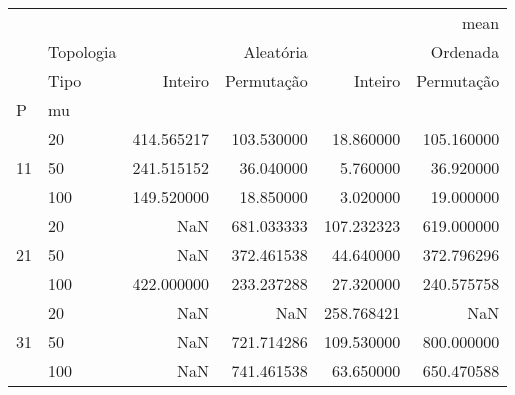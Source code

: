 \begin{tabular}{llrrrr}
\toprule
 &  & \multicolumn{4}{r}{mean} \\
 & Topologia & \multicolumn{2}{r}{Aleatória} & \multicolumn{2}{r}{Ordenada} \\
 & Tipo & Inteiro & Permutação & Inteiro & Permutação \\
P & mu &  &  &  &  \\
\midrule
\multirow[t]{3}{*}{11} & 20 & 414.565217 & 103.530000 & 18.860000 & 105.160000 \\
 & 50 & 241.515152 & 36.040000 & 5.760000 & 36.920000 \\
 & 100 & 149.520000 & 18.850000 & 3.020000 & 19.000000 \\
\cline{1-6}
\multirow[t]{3}{*}{21} & 20 & NaN & 681.033333 & 107.232323 & 619.000000 \\
 & 50 & NaN & 372.461538 & 44.640000 & 372.796296 \\
 & 100 & 422.000000 & 233.237288 & 27.320000 & 240.575758 \\
\cline{1-6}
\multirow[t]{3}{*}{31} & 20 & NaN & NaN & 258.768421 & NaN \\
 & 50 & NaN & 721.714286 & 109.530000 & 800.000000 \\
 & 100 & NaN & 741.461538 & 63.650000 & 650.470588 \\
\cline{1-6}
\bottomrule
\end{tabular}
